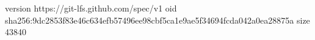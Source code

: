 version https://git-lfs.github.com/spec/v1
oid sha256:9dc2853f83e46c634efb57496ee98cbf5ca1e9ae5f34694fcda042a0ea28875a
size 43840
